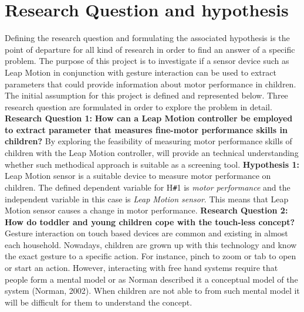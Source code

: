 \vspace{50mm} %
\hfill 
\break
\section{Research Question and hypothesis}
\label{sec:researchquestion}
Defining the research question and formulating the associated hypothesis is the point of departure for all kind of research in order to find an answer of a specific problem.
\newline
The purpose of this project is to investigate if a sensor device such as Leap Motion in conjunction with gesture interaction can be used to extract parameters that could provide information about motor performance in children. The initial assumption for this project is defined and represented below. Three research question are formulated in order to explore the problem in detail.
\vspace{3mm} %
\hfill \break
\textbf{Research Question 1:}\newline
\textbf{How can a Leap Motion controller be employed to extract parameter that measures fine-motor performance skills in children?}
\newline
By exploring the feasibility of measuring motor performance skills of children with the Leap Motion controller, will provide an technical understanding whether such methodical approach is suitable as a screening tool.   
\newline
\textbf{Hypothesis 1:} Leap Motion sensor is a suitable device to measure motor performance on children.
\vspace{3mm} %
\hfill \break
The defined dependent variable for H\texttt{\#}1 is \textit{motor performance} and the independent variable in this case is \textit{Leap Motion sensor}. This means that Leap Motion sensor causes a change in motor performance.
\vspace{3mm} %
\hfill \break
\textbf{Research Question 2:}\newline
\textbf{How do toddler and young children cope with the touch-less concept?}
\newline
Gesture interaction on touch based devices are common and existing in almost each household. Nowadays, children are grown up with this technology and know the exact gesture to a specific action. For instance, pinch to zoom or tab to open or start an action. However, interacting with free hand systems require that people form a mental model or as Norman described it a conceptual model of the system (Norman, 2002). When children are not able to from such mental model it will be difficult for them to understand the concept.
